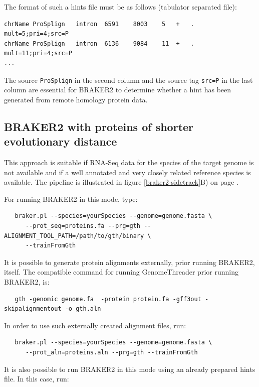 \documentclass[a4paper,10pt]{report}
\begin{document}
The format of such a hints file must be as follows (tabulator separated file):

\begin{verbatim}
chrName	ProSplign	intron	6591	8003	5	+	.	mult=5;pri=4;src=P
chrName	ProSplign	intron	6136	9084	11	+	.	mult=11;pri=4;src=P
...
\end{verbatim}

The source \texttt{ProSplign} in the second column and the source tag \texttt{src=P} in the last column are essential for BRAKER2 to determine whether a hint has been generated from remote homology protein data. 

\subsection{BRAKER2 with proteins of shorter evolutionary distance}\label{prot-in}

This approach is suitable if RNA-Seq data for the species of the target genome is not available and if a well annotated and very closely related reference species is available. The pipeline is illustrated in figure \ref{braker2-sidetrack}B) on page \pageref{braker2-sidetrack}.

For running BRAKER2 in this mode, type:

\begin{verbatim}
   braker.pl --species=yourSpecies --genome=genome.fasta \
      --prot_seq=proteins.fa --prg=gth --ALIGNMENT_TOOL_PATH=/path/to/gth/binary \
      --trainFromGth
\end{verbatim}

It is possible to generate protein alignments externally, prior running BRAKER2, itself. The compatible command for running GenomeThreader prior running BRAKER2, is:

\begin{verbatim}
   gth -genomic genome.fa  -protein protein.fa -gff3out -skipalignmentout -o gth.aln
\end{verbatim}


In order to use such externally created alignment files, run:

\begin{verbatim}
   braker.pl --species=yourSpecies --genome=genome.fasta \
      --prot_aln=proteins.aln --prg=gth --trainFromGth
\end{verbatim}

It is also possible to run BRAKER2 in this mode using an already prepared hints file. In this case, run:
\end{document}
